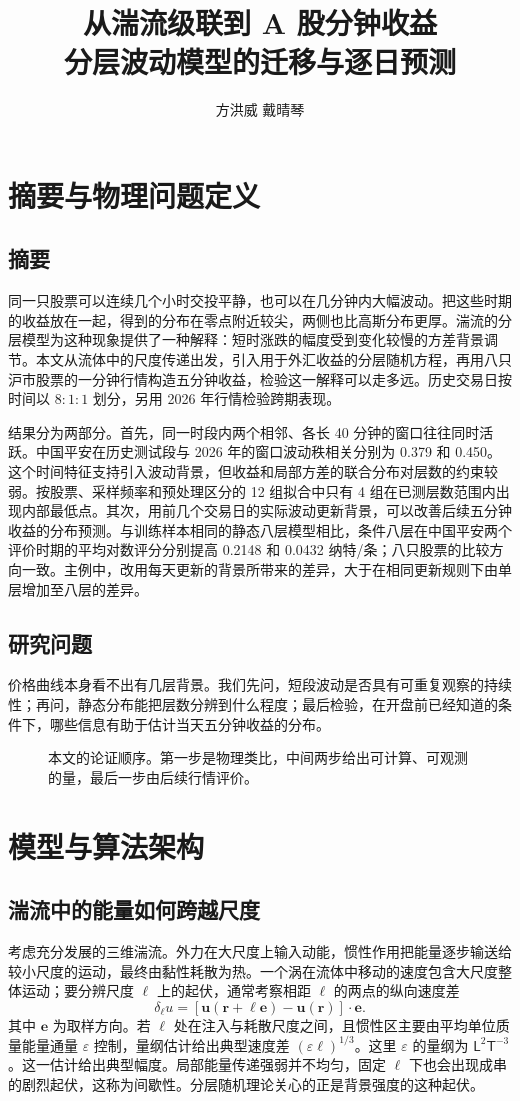 \documentclass[11pt,a4paper]{article}
\title{\textbf{从湍流级联到 A 股分钟收益}\\[4pt]\large 分层波动模型的迁移与逐日预测}
\author{方洪威 \qquad 戴晴琴}\date{}
\newcommand{\chart}[4]{\begin{figure}[H]\centering\resizebox{#1\linewidth}{!}{}\caption{#3}\label{#4}\end{figure}}
\begin{document}
\maketitle
\section{摘要与物理问题定义}
\subsection*{摘要}
同一只股票可以连续几个小时交投平静，也可以在几分钟内大幅波动。把这些时期的收益放在一起，得到的分布在零点附近较尖，两侧也比高斯分布更厚。湍流的分层模型为这种现象提供了一种解释：短时涨跌的幅度受到变化较慢的方差背景调节。本文从流体中的尺度传递出发，引入用于外汇收益的分层随机方程，再用八只沪市股票的一分钟行情构造五分钟收益，检验这一解释可以走多远。历史交易日按时间以 $8:1:1$ 划分，另用 2026 年行情检验跨期表现。

结果分为两部分。首先，同一时段内两个相邻、各长 40 分钟的窗口往往同时活跃。中国平安在历史测试段与 2026 年的窗口波动秩相关分别为 0.379 和 0.450。这个时间特征支持引入波动背景，但收益和局部方差的联合分布对层数的约束较弱。按股票、采样频率和预处理区分的 12 组拟合中只有 4 组在已测层数范围内出现内部最低点。其次，用前几个交易日的实际波动更新背景，可以改善后续五分钟收益的分布预测。与训练样本相同的静态八层模型相比，条件八层在中国平安两个评价时期的平均对数评分分别提高 0.2148 和 0.0432 纳特/条；八只股票的比较方向一致。主例中，改用每天更新的背景所带来的差异，大于在相同更新规则下由单层增加至八层的差异。

\subsection{研究问题}
价格曲线本身看不出有几层背景。我们先问，短段波动是否具有可重复观察的持续性；再问，静态分布能把层数分辨到什么程度；最后检验，在开盘前已经知道的条件下，哪些信息有助于估计当天五分钟收益的分布。
\chart{.96}{study_map}{本文的论证顺序。第一步是物理类比，中间两步给出可计算、可观测的量，最后一步由后续行情评价。}{fig:map}

\clearpage
\section{模型与算法架构}
\subsection{湍流中的能量如何跨越尺度}
考虑充分发展的三维湍流。外力在大尺度上输入动能，惯性作用把能量逐步输送给较小尺度的运动，最终由黏性耗散为热。一个涡在流体中移动的速度包含大尺度整体运动；要分辨尺度 $\ell$ 上的起伏，通常考察相距 $\ell$ 的两点的纵向速度差
\[
 \delta_\ell u=[\mathbf u(\mathbf r+\ell\mathbf e)-\mathbf u(\mathbf r)]\cdot\mathbf e.
\]
其中 $\mathbf e$ 为取样方向。若 $\ell$ 处在注入与耗散尺度之间，且惯性区主要由平均单位质量能量通量 $\varepsilon$ 控制，量纲估计给出典型速度差 $(\varepsilon\ell)^{1/3}$。这里 $\varepsilon$ 的量纲为 $\mathsf{L}^2\mathsf{T}^{-3}$。这一估计给出典型幅度。局部能量传递强弱并不均匀，固定 $\ell$ 下也会出现成串的剧烈起伏，这称为间歇性。分层随机理论关心的正是背景强度的这种起伏\cite{macedo2017,vasconcelos2024}。
\end{document}
